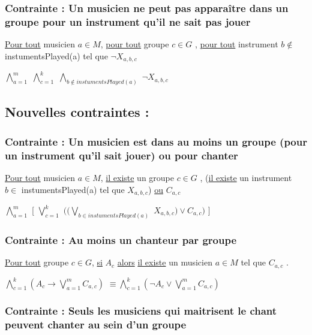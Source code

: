 \documentclass[a4paper,10pt]{article}
\begin{document}
\subsubsection{Contrainte : Un musicien ne peut pas apparaître dans un groupe pour un instrument qu'il ne sait pas jouer}


\underline{Pour tout} musicien $a \in M $, \underline{pour tout} groupe $c \in G$ , \underline{pour tout} instrument $b \notin $ instumentsPlayed(a)  tel que $\neg X_{a,b,c}$


$\bigwedge \limits_{a=1}^{m}$  $\bigwedge \limits_{c=1}^{k}$ $\bigwedge \limits_{b \notin instumentsPlayed(a) }$  $\neg X_{a,b,c}$


\subsection{Nouvelles contraintes : }

\subsubsection{Contrainte : Un musicien est dans au moins un groupe (pour un instrument qu'il sait jouer) ou pour chanter}


\underline{Pour tout} musicien $a \in M $, \underline{il existe} un groupe $c \in G$ , (\underline{il existe} un instrument $b \in$ instumentsPlayed(a)  tel que $X_{a,b,c}$) \underline{ou} $C_{a,c} $


$\bigwedge \limits_{a=1}^{m}$ [ $\bigvee \limits_{c=1}^{k}$ $ ( ( \bigvee \limits_{b \in instumentsPlayed(a) }$  $X_{a,b,c}) \vee C_{a,c} ) $ ]


\subsubsection{Contrainte : Au moins un chanteur par groupe}

\underline{Pour tout} groupe $c \in G$, \underline{si} $A_c$ \underline{alors} \underline{il existe} un musicien $a \in M$ tel que $C_{a,c}$ .

$ \bigwedge \limits_{c=1}^{k} ( A_c \rightarrow \bigvee \limits_{a=1}^{m} C_{a,c} ) $ 
$ \equiv \bigwedge \limits_{c=1}^{k} ( \neg A_c \vee \bigvee \limits_{a=1}^{m} C_{a,c} )  $

\subsubsection{Contrainte : Seuls les musiciens qui maitrisent le chant peuvent chanter au sein d'un groupe }
\end{document}
